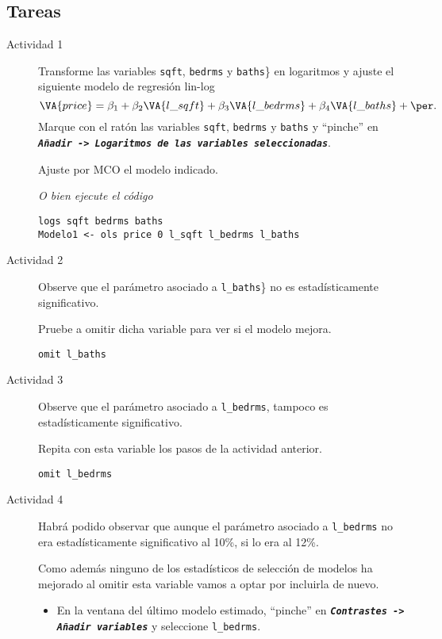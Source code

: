 \documentclass[11pt]{article}
\begin{document}
\subsection{Tareas}
\label{sec:org1c7b635}

\begin{description}
\item[{Actividad 1}] Transforme las variables \texttt{sqft}, \texttt{bedrms} y \texttt{baths}\}
en logaritmos y ajuste el siguiente modelo de regresión lin-log
\begin{displaymath}
  \VA{price}=
  \beta_1+
  \beta_2\VA{l\_sqft}  +
  \beta_3\VA{l\_bedrms}+
  \beta_4\VA{l\_baths} +
  \per.
\end{displaymath}
  Marque con el ratón las variables \texttt{sqft}, \texttt{bedrms} y \texttt{baths} y
``pinche'' en \textbf{\emph{\texttt{Añadir -> Logaritmos de las variables
  seleccionadas}}}.

Ajuste por MCO el modelo indicado.

\emph{O bien ejecute el código}
\begin{verbatim}
logs sqft bedrms baths
Modelo1 <- ols price 0 l_sqft l_bedrms l_baths
\end{verbatim}

\item[{Actividad 2}] Observe que el parámetro asociado a \texttt{l\_baths}\} no es
estadísticamente significativo.

Pruebe a omitir dicha variable para ver si el modelo mejora.
\begin{verbatim}
omit l_baths
\end{verbatim}

\item[{Actividad 3}] Observe que el parámetro asociado a \texttt{l\_bedrms},
tampoco es estadísticamente significativo.

Repita con esta variable los pasos de la actividad anterior.
\begin{verbatim}
omit l_bedrms
\end{verbatim}

\item[{Actividad 4}] Habrá podido observar que aunque el parámetro
asociado a \texttt{l\_bedrms} no era estadísticamente significativo al 10\%,
si lo era al 12\%.

Como además ninguno de los estadísticos de selección de modelos ha
mejorado al omitir esta variable vamos a optar por incluirla de
nuevo.
\begin{itemize}
\item En la ventana del último modelo estimado, ``pinche'' en
\textbf{\emph{\texttt{Contrastes -> Añadir variables}}} y seleccione \texttt{l\_bedrms}.


\end{itemize}
\end{description}
\end{document}
